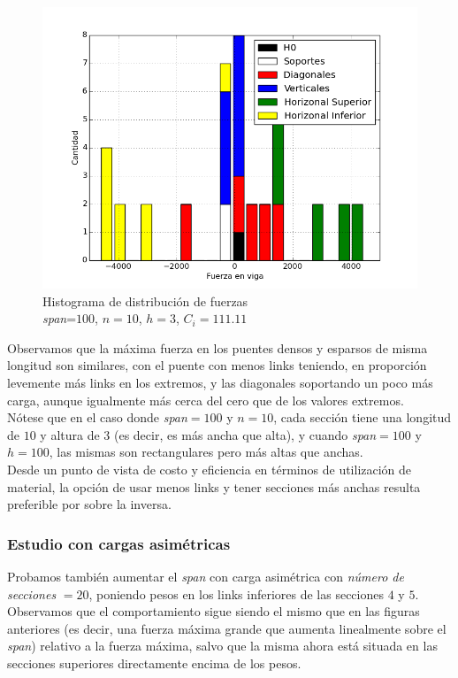 \begin{figure}[h!]
\begin{center}
\includegraphics[scale=0.5]{archivos/graficos/hist_n10_C1000.png}
\caption{\label{fig:hist_n10_C1000}Histograma de distribución de fuerzas\\
\textit{span}=$100$, $n=10$, $h=3$, $C_i=111.11$}
\end{center}
\end{figure}

Observamos que la máxima fuerza en los puentes densos y esparsos de misma longitud son similares, con el puente con menos links teniendo, en proporción levemente más links en los extremos, y las diagonales soportando un poco más carga, aunque igualmente más cerca del cero que de los valores extremos.\\

Nótese que en el caso donde \textit{span}$=100$ y $n=10$, cada sección tiene una longitud de $10$ y altura de $3$ (es decir, es más ancha que alta), y cuando \textit{span}$=100$ y $h=100$, las mismas son rectangulares pero más altas que anchas.\\

Desde un punto de vista de costo y eficiencia en términos de utilización de material, la opción de usar menos links y tener secciones más anchas resulta preferible por sobre la inversa.\\

\subsubsection{Estudio con cargas asimétricas}
Probamos también aumentar el \textit{span} con carga asimétrica con \textit{número de secciones} $=20$, poniendo pesos en los links inferiores de las secciones $4$ y $5$. Observamos que el comportamiento sigue siendo el mismo que en las figuras anteriores (es decir, una fuerza máxima grande que aumenta linealmente sobre el \textit{span}) relativo a la fuerza máxima, salvo que la misma ahora está situada en las secciones superiores directamente encima de los pesos.\\

